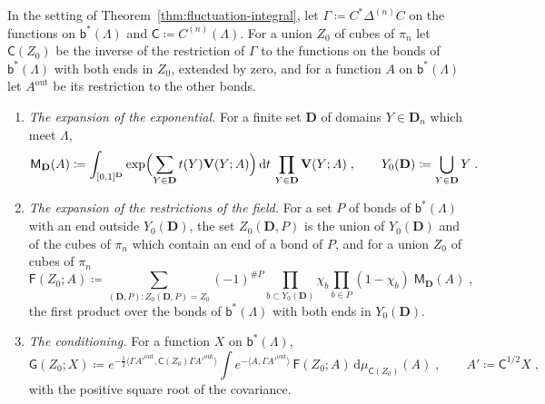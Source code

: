 \documentclass[11pt]{preprint}
\newcommand{\dd}{\mathrm{d}}
\numberwithin{equation}{section}
\begin{document}
\begin{definition}\label{def:fluctuation-activities}
In the setting of Theorem~\ref{thm:fluctuation-integral}, let $\Gamma \coloneqq C^*\Delta^{(n)}C$ on the functions on $\mathsf b^*(\Lambda)$ and $\mathsf C \coloneqq C^{(n)}(\Lambda)$. For a union $Z_0$ of cubes of $\pi_n$ let $\mathsf C(Z_0)$ be the inverse of the restriction of $\Gamma$ to the functions on the bonds of $\mathsf b^*(\Lambda)$ with both ends in $Z_0$, extended by zero, and for a function $A$ on $\mathsf b^*(\Lambda)$ let $A^{\mathrm{out}}$ be its restriction to the other bonds.
\begin{enumerate}[label=(\roman*)]
\item \emph{The expansion of the exponential.} For a finite set $\mathbf D$ of domains $Y \in \mathbf D_n$ which meet $\Lambda$,
\begin{equation}\label{eq:mayer-term}
    \mathsf M_{\mathbf D}(A) \coloneqq \int_{[0,1]^{\mathbf D}}\exp\Bigl(\sum_{Y \in \mathbf D}t(Y)\mathbf V(Y; A)\Bigr)\,\dd t\,\prod_{Y \in \mathbf D}\mathbf V(Y; A)\;,
    \qquad
    Y_0(\mathbf D) \coloneqq \bigcup_{Y \in \mathbf D}Y\;.
\end{equation}
\item \emph{The expansion of the restrictions of the field.} For a set $P$ of bonds of $\mathsf b^*(\Lambda)$ with an end outside $Y_0(\mathbf D)$, the set $Z_0(\mathbf D, P)$ is the union of $Y_0(\mathbf D)$ and of the cubes of $\pi_n$ which contain an end of a bond of $P$, and for a union $Z_0$ of cubes of $\pi_n$
\begin{equation}\label{eq:mayer-resummed}
    \mathsf F(Z_0; A) \coloneqq \sum_{(\mathbf D, P)\colon Z_0(\mathbf D, P) = Z_0}(-1)^{\#P}\prod_{b \subset Y_0(\mathbf D)}\chi_b\prod_{b \in P}(1 - \chi_b)\;\mathsf M_{\mathbf D}(A)\;,
\end{equation}
the first product over the bonds of $\mathsf b^*(\Lambda)$ with both ends in $Y_0(\mathbf D)$.
\item \emph{The conditioning.} For a function $X$ on $\mathsf b^*(\Lambda)$,
\begin{equation}\label{eq:conditioned-term}
    \mathsf G(Z_0; X) \coloneqq e^{-\frac{1}{2}\langle\Gamma A'^{\mathrm{out}}, \mathsf C(Z_0)\Gamma A'^{\mathrm{out}}\rangle}\int e^{-\langle A, \Gamma A'^{\mathrm{out}}\rangle}\,\mathsf F(Z_0; A)\,\dd\mu_{\mathsf C(Z_0)}(A)\;,
    \qquad
    A' \coloneqq \mathsf C^{1/2}X\;,
\end{equation}
with the positive square root of the covariance.

\end{enumerate}
\end{definition}
\end{document}
